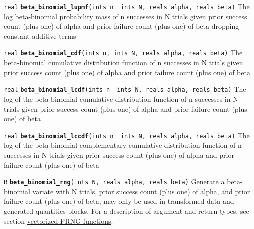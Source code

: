 \documentclass[
  10pt,
]{book}
\begin{document}
\texttt{real} \textbf{\texttt{beta\_binomial\_lupmf}}\texttt{(ints\ n\ \textbar{}\ ints\ N,\ reals\ alpha,\ reals\ beta)}\newline
The log beta-binomial probability mass of n successes in N trials
given prior success count (plus one) of alpha and prior failure count
(plus one) of beta dropping constant additive terms


\texttt{real} \textbf{\texttt{beta\_binomial\_cdf}}\texttt{(ints\ n,\ ints\ N,\ reals\ alpha,\ reals\ beta)}\newline
The beta-binomial cumulative distribution function of n successes in N
trials given prior success count (plus one) of alpha and prior failure
count (plus one) of beta


\texttt{real} \textbf{\texttt{beta\_binomial\_lcdf}}\texttt{(ints\ n\ \textbar{}\ ints\ N,\ reals\ alpha,\ reals\ beta)}\newline
The log of the beta-binomial cumulative distribution function of n
successes in N trials given prior success count (plus one) of alpha
and prior failure count (plus one) of beta


\texttt{real} \textbf{\texttt{beta\_binomial\_lccdf}}\texttt{(ints\ n\ \textbar{}\ ints\ N,\ reals\ alpha,\ reals\ beta)}\newline
The log of the beta-binomial complementary cumulative distribution
function of n successes in N trials given prior success count (plus
one) of alpha and prior failure count (plus one) of beta


\texttt{R} \textbf{\texttt{beta\_binomial\_rng}}\texttt{(ints\ N,\ reals\ alpha,\ reals\ beta)}\newline
Generate a beta-binomial variate with N trials, prior success count
(plus one) of alpha, and prior failure count (plus one) of beta; may
only be used in transformed data and generated quantities blocks.
For a description of argument and return types, see section
\protect\hyperlink{prng-vectorization}{vectorized PRNG functions}.
\end{document}
